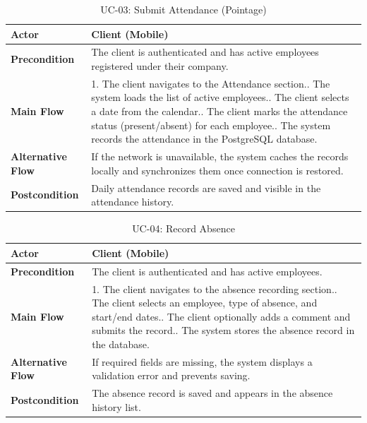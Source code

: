 \begin{table}[H]
\centering
\caption{UC-03: Submit Attendance (Pointage)}
\label{tab:uc03}
\begin{tabular}{|l|p{10cm}|}
\hline
\textbf{Actor} & Client (Mobile) \\
\hline
\textbf{Precondition} & The client is authenticated and has active employees registered under their company. \\
\hline
\textbf{Main Flow} & 1. The client navigates to the Attendance section.\newline 2. The system loads the list of active employees.\newline 3. The client selects a date from the calendar.\newline 4. The client marks the attendance status (present/absent) for each employee.\newline 5. The system records the attendance in the PostgreSQL database. \\
\hline
\textbf{Alternative Flow} & If the network is unavailable, the system caches the records locally and synchronizes them once connection is restored. \\
\hline
\textbf{Postcondition} & Daily attendance records are saved and visible in the attendance history. \\
\hline
\end{tabular}
\end{table}

\begin{table}[H]
\centering
\caption{UC-04: Record Absence}
\label{tab:uc04}
\begin{tabular}{|l|p{10cm}|}
\hline
\textbf{Actor} & Client (Mobile) \\
\hline
\textbf{Precondition} & The client is authenticated and has active employees. \\
\hline
\textbf{Main Flow} & 1. The client navigates to the absence recording section.\newline 2. The client selects an employee, type of absence, and start/end dates.\newline 3. The client optionally adds a comment and submits the record.\newline 4. The system stores the absence record in the database. \\
\hline
\textbf{Alternative Flow} & If required fields are missing, the system displays a validation error and prevents saving. \\
\hline
\textbf{Postcondition} & The absence record is saved and appears in the absence history list. \\
\hline
\end{tabular}
\end{table}

